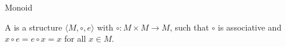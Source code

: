 \documentclass{stex}
\begin{document}
\begin{smodule}{Monoid}
  \begin{definition}
    A \textbf{} is a structure $\langle M,\circ,e\rangle$
    with $\circ:M\times M\to M$, such that $\circ$ is associative and
    $x\circ e=e \circ x = x$ for all $x\in M$.
  \end{definition}
\end{smodule}
\end{document}
